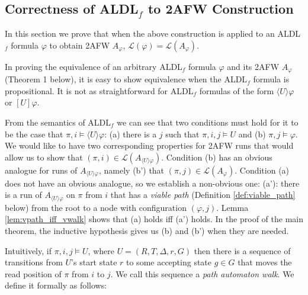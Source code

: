 \documentclass[10pt,a4paper]{amsart}
\theoremstyle{plain}
\theoremstyle{definition}
\theoremstyle{definition}
\newcommand{\dbox}[1]{\langle #1 \rangle}
\newcommand{\bbox}[1]{[ #1 ]}
\DeclareMathOperator{\?}{?}
\begin{document}
\subsection{\texorpdfstring{Correctness of ALDL$_f$ to 2AFW Construction}{Correctness of ALDLf to 2AFW Construction}}

In this section we prove that when the above construction is applied to an ALDL$_f$
formula $\varphi$ to obtain 2AFW $A_\varphi$, $\mathcal{L}(\varphi) = \mathcal{L}(A_\varphi)$. 

In proving the equivalence of an arbitrary ALDL$_f$ formula $\varphi$ and its 2AFW $A_\varphi$ (Theorem 1 below),
it is easy to show equivalence when the ALDL$_f$ formula is propositional. It is not as straightforward for
ALDL$_f$ formulas of the form $\dbox{U}\varphi$ or $\bbox{U}\varphi$.

From the semantics of ALDL$_f$ we can see that two conditions must hold for it to be the case that
$\pi,i \models \dbox{U}\varphi$: (a) there is a $j$ such that $\pi,i,j \models U$ and (b) $\pi,j \models \varphi$.
We would like to have two corresponding properties for 2AFW runs that would allow us to show that $(\pi,i) \in \mathcal{L}(A_{\dbox{U}\varphi})$.
Condition (b) has an obvious analogue for runs of $A_{\dbox{U}\varphi}$, namely (b') that $(\pi,j) \in \mathcal{L}(A_{\varphi})$.
Condition (a) does not have an obvious analogue, so we establish a non-obvious one:
(a'): there is a run of $A_{\dbox{U}\varphi}$ on $\pi$ from $i$ that has a \textit{viable path} (Definition \ref{def:viable_path} below)
from the root to a node with configuration $(\varphi,j)$. Lemma \ref{lem:vpath_iff_vwalk} shows that (a) holds iff (a') holds. In
the proof of the main theorem, the inductive hypothesis gives us (b) and (b') when they are needed.


Intuitively, if $\pi,i,j \models U$, where $U = (R,T,\Delta,r,G)$ then there is a sequence
of transitions from $U$'s start state $r$ to some accepting state $g \in G$ that moves the
read position of $\pi$ from $i$ to $j$. We call this sequence a \textit{path automaton walk}.
We define it formally as follows:
\end{document}
